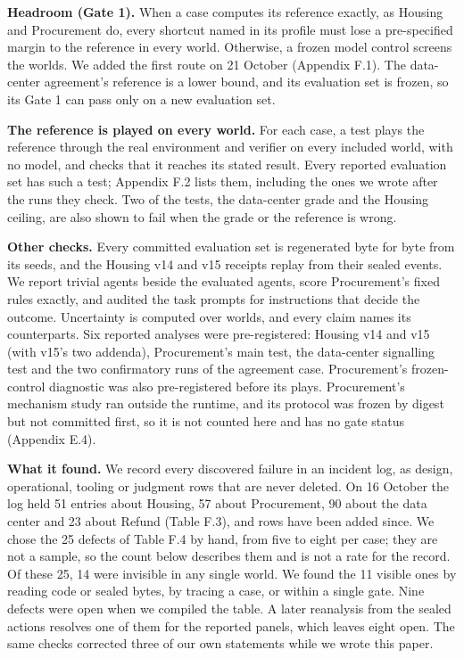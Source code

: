 \textbf{Headroom (Gate 1).} When a case computes its reference exactly, as Housing and Procurement do, every shortcut named
in its profile must lose a pre-specified margin to the reference in every world. Otherwise, a frozen model control
screens the worlds. We added the first route on 21 October (Appendix F.1). The data-center agreement's reference is a
lower bound, and its evaluation set is frozen, so its Gate 1 can pass only on a new evaluation set.

\textbf{The reference is played on every world.} For each case, a test plays the reference through the
real environment and verifier on every included world, with no model, and checks that it reaches
its stated result. Every reported evaluation set has such a test; Appendix F.2 lists them, including the ones we
wrote after the runs they check. Two of the tests, the data-center grade and the Housing ceiling, are also shown to
fail when the grade or the reference is wrong.

\textbf{Other checks.} Every committed evaluation set is regenerated byte for byte from its seeds, and the Housing
v14 and v15 receipts replay from their sealed events. We report trivial agents beside the evaluated agents, score
Procurement's fixed rules exactly, and audited the task prompts for instructions that
decide the outcome. Uncertainty is computed over worlds, and every claim names its counterparts. Six
reported analyses were pre-registered: Housing v14 and v15 (with v15's two addenda), Procurement's
main test, the data-center signalling test and the two confirmatory runs of the agreement case. Procurement's
frozen-control diagnostic was also pre-registered before its plays. Procurement's mechanism study ran outside the
runtime, and its protocol was frozen by digest but not committed first, so it is not counted here and has no gate status
(Appendix E.4).

\textbf{What it found.} We record every discovered failure in an incident log, as design,
operational, tooling or judgment rows that are never deleted. On 16 October the log held 51 entries about Housing,
57 about Procurement, 90 about the data center and 23 about Refund (Table F.3), and rows have been added since. We chose the
25 defects of Table F.4 by hand, from five to eight per case; they are not a sample, so the count below
describes them and is not a rate for the record. Of these 25, 14 were invisible in any single world. We found the 11 visible ones by reading
code or sealed bytes, by tracing a case, or within a single gate. Nine defects were open when we compiled the
table. A later reanalysis from the sealed actions resolves one of them for the reported panels, which leaves eight
open. The same checks corrected three of our own statements while we wrote this paper.
